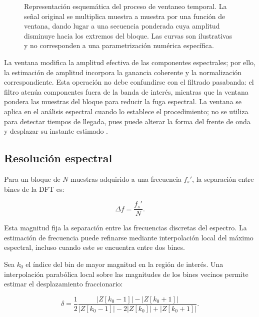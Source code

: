 \begin{figure}[htbp]

    \caption{Representación esquemática del proceso de ventaneo
    temporal. La señal original se multiplica muestra a muestra
    por una función de ventana, dando lugar a una secuencia
    ponderada cuya amplitud disminuye hacia los extremos del
    bloque. Las curvas son ilustrativas y no corresponden a una
    parametrización numérica específica.}
    \label{fig:ventaneo_temporal}
\end{figure}

La ventana modifica la amplitud efectiva de las componentes
espectrales; por ello, la estimación de amplitud incorpora la ganancia
coherente y la normalización correspondiente. Esta operación no debe
confundirse con el filtrado pasabanda: el filtro atenúa componentes
fuera de la banda de interés, mientras que la ventana pondera las
muestras del bloque para reducir la fuga espectral. La ventana se
aplica en el análisis espectral cuando lo establece el procedimiento;
no se utiliza para detectar tiempos de llegada, pues puede alterar
la forma del frente de onda y desplazar su instante estimado
\cite{harris1978use,oppenheim1999discrete}.

\subsection*{Resolución espectral}

Para un bloque de $N$ muestras adquirido a una frecuencia $f_s'$, la
separación entre bines de la DFT es:

\begin{equation}
    \Delta f
    =
    \frac{f_s'}{N}.
    \label{eq:resolucion_bin}
\end{equation}

Esta magnitud fija la separación entre las frecuencias discretas
del espectro. La estimación de frecuencia puede refinarse mediante
interpolación local del máximo espectral, incluso cuando este se
encuentra entre dos bines.

Sea $k_0$ el índice del bin de mayor magnitud en la región de interés.
Una interpolación parabólica local sobre las magnitudes de los bines
vecinos permite estimar el desplazamiento fraccionario:

\begin{equation}
    \delta
    =
    \frac{1}{2}
    \frac{
        |Z[k_0-1]|-|Z[k_0+1]|
    }{
        |Z[k_0-1]|-2|Z[k_0]|+|Z[k_0+1]|
    }.
    \label{eq:interpolacion_parabolica}
\end{equation}

